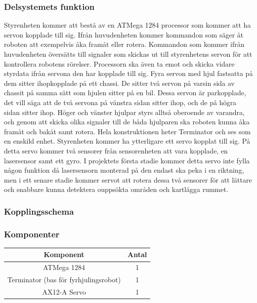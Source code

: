 \documentclass{article}
\begin{document}
\subsubsection{Delsystemets funktion}
Styrenheten kommer att bestå av en ATMega 1284 processor som kommer att ha servon kopplade till sig. Ifrån huvudenheten kommer kommandon som säger åt roboten att exempelvis åka framåt eller rotera. Kommandon som kommer ifrån huvudenheten översätts till signaler som skickas ut till styrenhetens servon för att kontrollera robotens rörelser. Processorn ska även ta emot och skicka vidare styrdata ifrån servona den har kopplade till sig.
\newline\newline
Fyra servon med hjul fastsatta på dem sitter ihopkopplade på ett chassi. De sitter två servon på varsin sida av chassit på samma sätt som hjulen sitter på en bil. Dessa servon är parkopplade, det vill säga att de två servona på vänstra sidan sitter ihop, och de på högra sidan sitter ihop. Höger och vänster hjulpar styrs alltså oberoende av varandra, och genom att skicka olika signaler till de båda hjulparen ska roboten kunna åka framåt och bakåt samt rotera. Hela konstruktionen heter Terminator och ses som en enskild enhet.
\newline\newline
Styrenheten kommer ha ytterligare ett servo kopplat till sig. På detta servo kommer två sensorer från sensorenheten att vara kopplade, en lasersensor samt ett gyro. I projektets första stadie kommer detta servo inte fylla någon funktion då lasersensorn monterad på den endast ska peka i en riktning, men i ett senare stadie kommer servot att rotera dessa två sensorer för att lättare och snabbare kunna detektera ouppsökta områden och kartlägga rummet.


\subsubsection{Kopplingsschema}

\subsubsection{Komponenter}

\begin{table}[H]
  \centering
  \begin{tabular}{ | c | c |}
    \hline
    \textbf{Komponent} & \textbf{Antal} \\
    \hline
    ATMega 1284 & 1 \\
    \hline
    Terminator (bas för fyrhjulingsrobot) & 1 \\
    \hline
    AX12-A Servo & 1 \\
    \hline

  \end{tabular}
\end{table}
\end{document}
